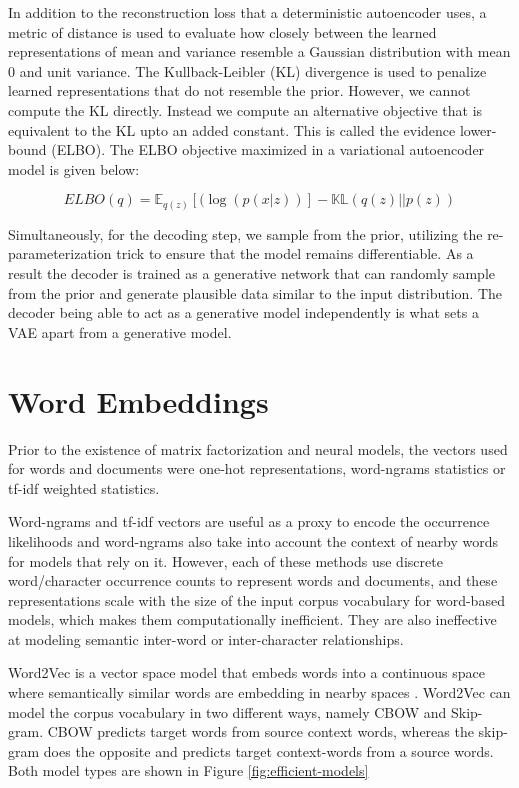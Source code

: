 In addition to the reconstruction loss that a deterministic autoencoder uses, a metric of distance is used to evaluate how closely between the learned representations of mean and variance resemble a Gaussian distribution with mean 0 and unit variance. The Kullback-Leibler (KL) divergence \citep{kullback1951information} is used to penalize learned representations that do not resemble the prior. However, we cannot compute the KL directly. Instead we compute an alternative objective that is equivalent to the KL upto an added constant. This is called the evidence lower-bound (ELBO). The ELBO objective maximized in a variational autoencoder model is given below:

\begin{equation}
	ELBO(q) = \mathbb{E}_{q(z)} [(\log(p(x|z))] - \mathbb{KL}(q(z)||p(z))
\end{equation}

Simultaneously, for the decoding step, we sample from the prior, utilizing the re-parameterization trick to ensure that the model remains differentiable. As a result the decoder is trained as a generative network that can randomly sample from the prior and generate plausible data similar to the input distribution. The decoder being able to act as a generative model independently is what sets a VAE apart from a generative model.


\section{Word Embeddings}

Prior to the existence of matrix factorization and neural models, the vectors used for words and documents were one-hot representations, word-ngrams statistics \citep{brown1992class} or tf-idf weighted statistics.

Word-ngrams and tf-idf vectors are useful as a proxy to encode the occurrence likelihoods and word-ngrams also take into account the context of nearby words for models that rely on it. However, each of these methods use discrete word/character occurrence counts to represent words and documents, and these representations scale with the size of the input corpus vocabulary for word-based models, which makes them computationally inefficient. They are also ineffective at modeling semantic inter-word or inter-character relationships.

Word2Vec is a vector space model that embeds words into a continuous space where semantically similar words are embedding in nearby spaces \citep{mikolov2013distributed,mikolov2013linguistic,le2014distributed}. Word2Vec can model the corpus vocabulary in two different ways, namely CBOW and Skip-gram. CBOW predicts target words from source context words, whereas the skip-gram does the opposite and predicts target context-words from a source words. Both model types are shown in Figure \ref{fig:efficient-models}

